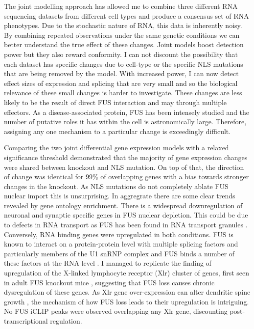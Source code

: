 The joint modelling approach has allowed me to combine three different RNA sequencing datasets from different cell types and produce a consensus set of RNA phenotypes.
Due to the stochastic nature of RNA, this data is inherently noisy. 
By combining repeated observations  under the same genetic conditions we can better understand the true effect of these changes.
Joint models boost detection power but they also reward conformity. 
I can not discount the possibility that each dataset has specific changes due to cell-type or the specific NLS mutations that are being removed by the model.
With increased power, I can now detect effect sizes of expression and splicing that are very small and so the biological relevance of these small changes is harder to investigate.
These changes are less likely to be the result of direct FUS interaction and may through multiple effectors.
As a disease-associated protein, FUS has been intensely studied and the number of putative roles it has within the cell is astronomically large.  Therefore, assigning any one mechanism to a particular change is exceedingly difficult.

Comparing the two joint differential gene expression models with a relaxed significance threshold demonstrated that the majority of gene expression changes were shared between knockout and NLS mutation.
On top of that, the direction of change was identical for 99\% of overlapping genes with a bias towards stronger changes in the knockout. 
As NLS mutations do not completely ablate FUS nuclear import this is unsurprising. 
In aggregrate there are some clear trends revealed by gene ontology enrichment. 
There is a widespread downregulation of neuronal and synaptic specific genes in FUS nuclear depletion. 
This could be due to defects in RNA transport as FUS has been found in RNA transport granules \citep{Kanai2004, Fujii2005}.
Conversely, RNA binding genes were upregulated in both conditions. 
FUS is known to interact on a protein-protein level with multiple splicing factors \citep{Yang1998,Meissner2003, Groen2013} and particularly members of the U1 snRNP complex \citep{Sun2015a, Yu2015} and FUS binds a number of these factors at the RNA level \citep{Nakaya2013}.
I managed to replicate the finding of upregulation of the X-linked lymphocyte receptor (Xlr) cluster of genes, first seen in adult FUS knockout mice \citep{Kino2015}, suggesting that FUS loss causes chronic dysregulation of these genes. 
As Xlr gene over-expression can alter dendritic spine growth \cite{Cubelos2010}, the mechanism of how FUS loss leads to their upregulation is intriguing. 
No FUS iCLIP peaks were observed overlapping any Xlr gene, discounting post-transcriptional regulation.


